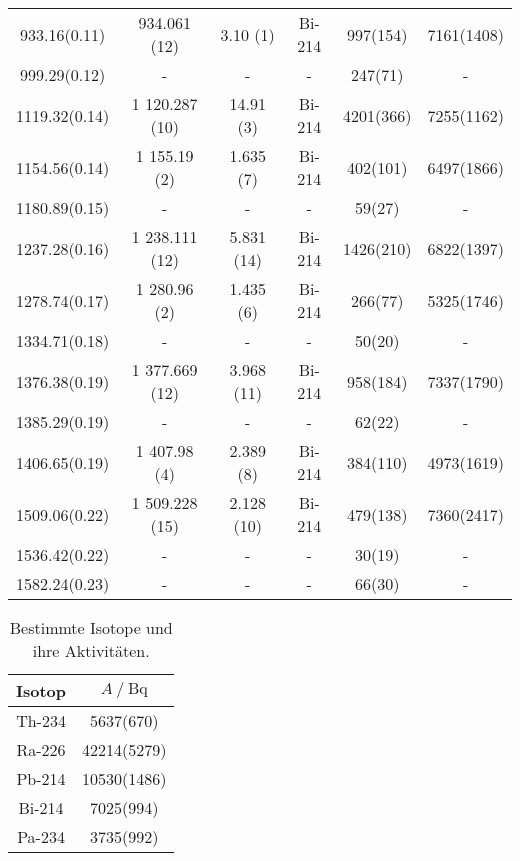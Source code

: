 \begin{table}
\begin{tabular}{S[table-format=4.3(4), separate-uncertainty] S[table-format=4.3(1), separate-uncertainty] S[table-format=3.4(1)] c S[table-format=5.0(3)] S[table-format=5.0(4)]}
        933.16(0.11)    &    934.061 (12)&   3.10 (1)   &   {Bi-214}  &  997(154)    & 7161(1408)    \\
        999.29(0.12)    &     {-}        &    {-}       &      {-}    &  247(71)     & {-}           \\
        1119.32(0.14)   & 1 120.287 (10) &  14.91 (3)   &   {Bi-214}  &  4201(366)   & 7255(1162)    \\
        1154.56(0.14)   & 1 155.19 (2)   &   1.635 (7)  &   {Bi-214}  &  402(101)    & 6497(1866)    \\
        1180.89(0.15)   &      {-}       &    {-}       &       {-}   &  59(27)      & {-}           \\
        1237.28(0.16)   &1 238.111 (12)  &  5.831 (14)  &   {Bi-214}  &  1426(210)   & 6822(1397)    \\
        1278.74(0.17)   &1 280.96 (2)    & 1.435 (6)    &   {Bi-214}  &  266(77)     & 5325(1746)    \\
        1334.71(0.18)   &    {-}         &       {-}    &      {-}    &  50(20)      & {-}           \\
        1376.38(0.19)   & 1 377.669 (12) &3.968 (11)    &   {Bi-214}  &  958(184)    & 7337(1790)    \\
        1385.29(0.19)   &      {-}       &      {-}     &      {-}    &  62(22)      & {-}           \\
        1406.65(0.19)   & 1 407.98 (4)   & 2.389 (8)    &  {Bi-214}   &  384(110)    & 4973(1619)    \\
        1509.06(0.22)   &1 509.228 (15)  & 2.128 (10)   &  {Bi-214}   &  479(138)    & 7360(2417)    \\
        1536.42(0.22)   &      {-}       &      {-}     &    {-}      &  30(19)      & {-}           \\
        1582.24(0.23)   &      {-}       &    {-}       &      {-}    &  66(30)      & {-}           \\
        \bottomrule
    \end{tabular}
\end{table}


\begin{table}
    \centering
    \caption{Bestimmte Isotope und ihre Aktivitäten.}
    \label{tab:Aktivitäten}
    \begin{tabular}{c S[table-format=5.0(4)]}
        \toprule
        {Isotop} & {$A \mathbin{/} \unit{\becquerel}$}\\
        \midrule           
                {Th-234} & 5637(670)\\
                {Ra-226} & 42214(5279)\\
                {Pb-214} & 10530(1486)\\
                {Bi-214} & 7025(994)\\
                {Pa-234} & 3735(992)\\
                \bottomrule
    \end{tabular}
\end{table}

